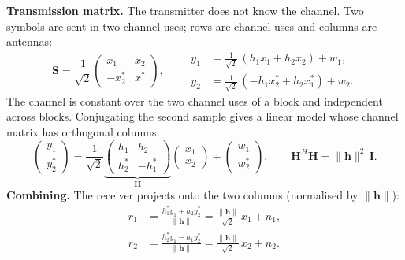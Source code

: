 \documentclass[11pt,a4paper]{article}
\newcommand{\norm}[1]{\lVert #1 \rVert}
\newcommand{\h}{\mathbf{h}}
\begin{document}
\textbf{Transmission matrix.} The transmitter does not know the channel.
Two symbols are sent in two channel uses; rows are channel uses and columns are
antennas:
\begin{equation}
  \mathbf{S} = \frac{1}{\sqrt2}\begin{pmatrix} x_1 & x_2 \\ -x_2^* & x_1^* \end{pmatrix},
  \qquad
  \begin{aligned}
    y_1 &= \tfrac{1}{\sqrt2}\,(h_1x_1 + h_2x_2) + w_1,\\
    y_2 &= \tfrac{1}{\sqrt2}\,(-h_1x_2^* + h_2x_1^*) + w_2 .
  \end{aligned}
  \label{eq:alamouti}
\end{equation}
The channel is constant over the two channel uses of a block and independent
across blocks. Conjugating the second sample gives a linear model whose channel
matrix has orthogonal columns:
\begin{equation*}
  \begin{pmatrix} y_1 \\ y_2^* \end{pmatrix}
  = \frac{1}{\sqrt2}\underbrace{\begin{pmatrix} h_1 & h_2 \\ h_2^* & -h_1^* \end{pmatrix}}_{\mathbf{H}}
    \begin{pmatrix} x_1 \\ x_2 \end{pmatrix}
  + \begin{pmatrix} w_1 \\ w_2^* \end{pmatrix},
  \qquad \mathbf{H}^H\mathbf{H} = \norm{\h}^2\,\mathbf{I}.
\end{equation*}
\textbf{Combining.} The receiver projects onto the two columns (normalised by
$\norm{\h}$):
\begin{equation}
  \begin{aligned}
    r_1 &= \frac{h_1^*y_1 + h_2y_2^*}{\norm{\h}} = \frac{\norm{\h}}{\sqrt2}\,x_1 + n_1,\\
    r_2 &= \frac{h_2^*y_1 - h_1y_2^*}{\norm{\h}} = \frac{\norm{\h}}{\sqrt2}\,x_2 + n_2.
  \end{aligned}
  \label{eq:alamouti-comb}
\end{equation}
\end{document}
